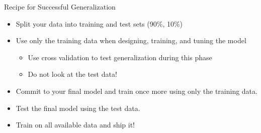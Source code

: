 \documentclass[aspectratio=169]{../latex_main/tntbeamer}  %
\begin{document}
	\begin{frame}[c]{Recipe for Successful Generalization}
	    \begin{itemize}
	        \item Split your data into training and test sets (90\%, 10\%)
	        \item Use only the training data when designing, training, and tuning the model
	        \begin{itemize}
	            \item Use cross validation to test generalization during this phase
	            \item Do not look at the test data!
	        \end{itemize}
	        \item Commit to your final model and train once more using only the training data.
	        \item Test the final model using the test data. 
	        \item Train on all available data and ship it!
	    \end{itemize}
	\end{frame}
\end{document}
